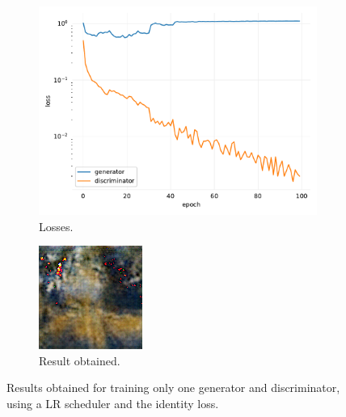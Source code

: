 \documentclass[twocolumn,superscriptaddress,aps,floatfix,nofootinbib]{revtex4-1}
\begin{document}
    \begin{figure}[H]
        \centering
        \begin{subfigure}[b]{0.22\textwidth}
            \centering
            \includegraphics[width=\textwidth]{resources/png/gan-losses/onemodid.pdf}
            \caption{Losses.}
        \end{subfigure}
        \hfill
        \begin{subfigure}[b]{0.22\textwidth}
            \centering
            \includegraphics[width=\textwidth]{resources/png/gan-results/onemodid.png}
            \caption{Result obtained.}
            \label{fig:one2}
        \end{subfigure}
        \caption{Results obtained for training only one generator and discriminator, using a LR scheduler and the identity loss.}
    \end{figure}
    
\end{document}
